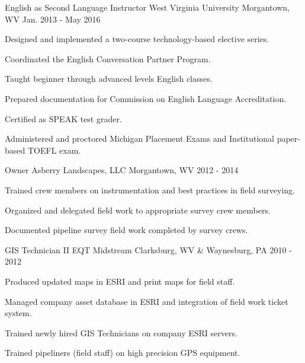 \begin{cventries}

\cventry
{English as Second Language Instructor} %
{West Virginia University} %
{Morgantown, WV} %
{Jan. 2013 - May 2016} %
{ %
\begin{cvitems}
\item {Designed and implemented a two-course technology-based elective series.}
\item {Coordinated the English Conversation Partner Program.}
\item {Taught beginner through advanced levels English classes.}
\item {Prepared documentation for Commission on English Language Accreditation.}
\item {Certified as SPEAK test grader.}
\item {Administered and proctored Michigan Placement Exams and Institutional paper-based TOEFL exam.}
\end{cvitems}
}


\cventry
{Owner} %
{Asberry Landscapes, LLC} %
{Morgantown, WV} %
{2012 - 2014} %
{ %
\begin{cvitems}
\item {Trained crew members on instrumentation and best practices in field surveying.}
\item {Organized and delegated field work to appropriate survey crew members.}
\item {Documented pipeline survey field work completed by survey crews.}
\end{cvitems} 
}


\cventry
{GIS Technician II} %
{EQT Midstream} %
{Clarksburg, WV \& Waynesburg, PA} %
{2010 - 2012} %
{ %
\begin{cvitems}
\item {Produced updated maps in ESRI and print maps for field staff.}
\item {Managed company asset database in ESRI and integration of field work ticket system.}
\item {Trained newly hired GIS Technicians on company ESRI servers.}
\item {Trained pipeliners (field staff) on high precision GPS equipment.}
\end{cvitems}
}


\end{cventries}

